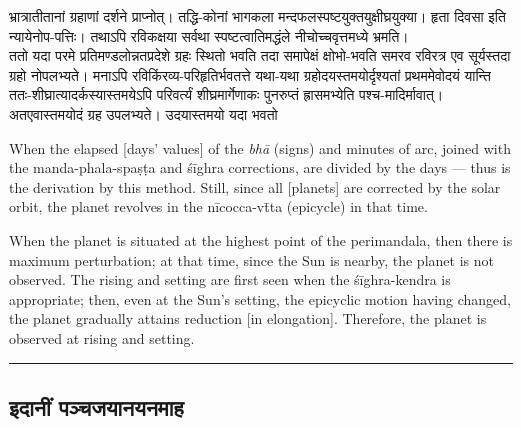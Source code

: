 \documentclass[11pt,a4paper]{article}
\newcommand{\longline}{\noindent\rule{\textwidth}{0.4pt}}
\newcommand{\dev}[1]{{\devanagarifont #1}}
\newcommand{\sectsep}{\par\vspace{0.8em}\longline\vspace{0.8em}}
\begin{document}
\begin{minipage}[t]{0.48\textwidth}
\small\devanagarifont
भ्रात्रातीतानां ग्रहाणां दर्शने प्राप्नोत्। तद्धि-कोनां भागकला मन्दफलस्पष्टयुक्तयुक्षीघ्रयुक्या। हृता दिवसा इति न्यायेनोप-पत्तिः। तथाऽपि रविकक्षया सर्वथा स्पष्टत्वातिमद्धंले नीचोच्चवृत्तमध्ये भ्रमति।\\
ततो यदा परमे प्रतिमण्डलोन्नतप्रदेशे ग्रहः स्थितो भवति तदा समापेक्षं क्षोभो-भवति समरव रविरत्र एव सूर्यस्तदा ग्रहो नोपलभ्यते। मनाऽपि रविकिंरव्य-परिहृतिर्भवतत्ते यथा-यथा ग्रहोदयस्तमयोर्दृश्यतां प्रथममेवोदयं यान्ति ततः-शीघ्रात्यादर्कस्यास्तमयेऽपि परिवर्त्यं शीघ्रमार्गेणाकः पुनरुप्तं ह्रासमभ्येति पश्च-मादिर्मावात्। अतएवास्तमयोदं ग्रह उपलभ्यते। उदयास्तमयो यदा भवतो
\end{minipage}%
\hfill
\begin{minipage}[t]{0.48\textwidth}
\small
When the elapsed [days' values] of the \textit{bh\=a} (signs) and minutes of arc, joined with the manda-phala-spa\d{s}\d{t}a and \'s\=ighra corrections, are divided by the days --- thus is the derivation by this method. Still, since all [planets] are corrected by the solar orbit, the planet revolves in the n\=icocca-v\=tta (epicycle) in that time.

When the planet is situated at the highest point of the perimandala, then there is maximum perturbation; at that time, since the Sun is nearby, the planet is not observed. The rising and setting are first seen when the \'s\=ighra-kendra is appropriate; then, even at the Sun's setting, the epicyclic motion having changed, the planet gradually attains reduction [in elongation]. Therefore, the planet is observed at rising and setting.
\end{minipage}

\sectsep

\subsection{\dev{इदानीं पञ्चजयानयनमाह}}
\end{document}
